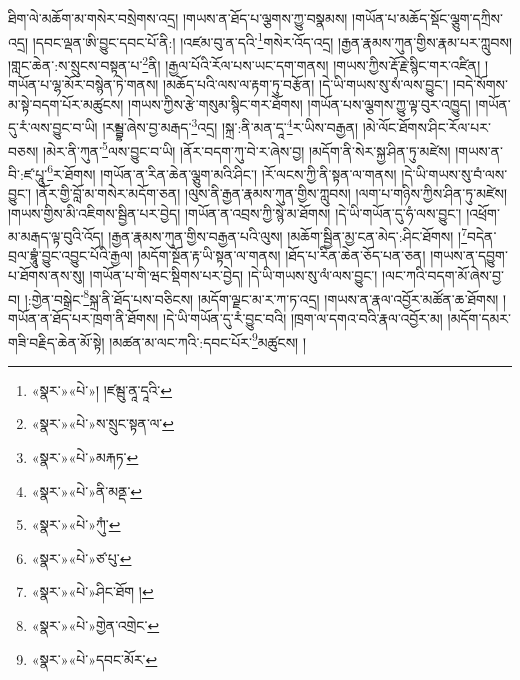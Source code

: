 ཐིག་ལེ་མཆོག་མ་གསེར་བསྲེགས་འདྲ། །གཡས་ན་ཐོད་པ་ལྕགས་ཀྱུ་བསྣམས། །གཡོན་པ་མཆོད་སྡོང་ལྕུག་དཀྲིས་འདྲ། །དབང་ལྡན་ཨི་བྱུང་དབང་པོ་ནི:། །འཛམ་བུ་ན་དའི་\footnote{«སྣར་»«པེ་»། །ཛམྦུ་ནཱ་དཱའི་}གསེར་འོད་འདྲ། །རྒྱན་རྣམས་ཀུན་གྱིས་རྣམ་པར་ཀླུབས། །གླང་ཆེན་:ས་སྲུངས་བསྟན་པ་\footnote{«སྣར་»«པེ་»ས་སྲུང་སྟན་ལ་}ནི། །རྒྱལ་པོའི་རོལ་པས་ཡང་དག་གནས། །གཡས་ཀྱིས་རྡོ་རྗེ་སྙིང་གར་འཛིན། །གཡོན་པ་ལྷ་མོར་བསྙེན་ཏེ་གནས། །མཆོད་པའི་ལས་ལ་རྟག་ཏུ་བརྩོན། །དེ་ཡི་གཡས་སུ་སཾ་ལས་བྱུང་། །བདེ་སོགས་མ་སྟེ་བདག་པོར་མཚུངས། །གཡས་ཀྱིས་རྩེ་གསུམ་སྙིང་གར་ཐོགས། །གཡོན་པས་ལྕགས་ཀྱུ་ལྟ་བུར་འཁྱུད། །གཡོན་དུ་རཾ་ལས་བྱུང་བ་ཡི། །རམྦྷ་ཞེས་བྱ་མརྒད་\footnote{«སྣར་»«པེ་»མརྐཏ་}འདྲ། །སྐྲ་:ནི་མན་དཱ་\footnote{«སྣར་»«པེ་»ནི་མནྡ་}ར་ཡིས་བརྒྱན། །མེ་ལོང་ཐོགས་ཤིང་རོལ་པར་བཅས། །མེར་ནི་ཀུན་\footnote{«སྣར་»«པེ་»ཀུཾ་}ལས་བྱུང་བ་ཡི། །ནོར་བདག་ཀུ་བེ་ར་ཞེས་བྱ། །མདོག་ནི་སེར་སྐྱ་ཤིན་ཏུ་མཛེས། །གཡས་ན་བི་:ཛ་པཱུ་\footnote{«སྣར་»«པེ་»ཙ་པུ་}ར་ཐོགས། །གཡོན་ན་རིན་ཆེན་ལྕུག་མའི་ཤིང་། །རོ་ལངས་ཀྱི་ནི་སྟན་ལ་གནས། །དེ་ཡི་གཡས་སུ་བཾ་ལས་བྱུང་། །ནོར་གྱི་བློ་མ་གསེར་མདོག་ཅན། །ལུས་ནི་རྒྱན་རྣམས་ཀུན་གྱིས་ཀླུབས། །ལག་པ་གཉིས་ཀྱིས་ཤིན་ཏུ་མཛེས། །གཡས་གྱིས་མི་འཇིགས་སྦྱིན་པར་བྱེད། །གཡོན་ན་འབྲས་ཀྱི་སྙེ་མ་ཐོགས། །དེ་ཡི་གཡོན་དུ་ཧཾ་ལས་བྱུང་། །འཕྲོག་མ་མརྒད་ལྟ་བུའི་འོད། །རྒྱན་རྣམས་ཀུན་གྱིས་བརྒྱན་པའི་ལུས། །མཆོག་སྦྱིན་མྱ་ངན་མེད་:ཤིང་ཐོགས། །\footnote{«སྣར་»«པེ་»ཤིང་ཐོག །}བདེན་བྲལ་བྷཱུཾ་བྱུང་འབྱུང་པོའི་རྒྱལ། །མདོག་སྔོན་རྟ་ཡི་སྟན་ལ་གནས། །ཐོད་པ་རིན་ཆེན་ཅོད་པན་ཅན། །གཡས་ན་དབྱུག་པ་ཐོགས་ནས་སུ། །གཡོན་པ་གི་ཝང་སྡིགས་པར་བྱེད། །དེ་ཡི་གཡས་སུ་ལཾ་ལས་བྱུང་། །ལང་ཀའི་བདག་མོ་ཞེས་བྱ་བ། །:གྱེན་བསྒྲེང་\footnote{«སྣར་»«པེ་»གྱེན་འགྲེང་}སྐྲ་ནི་ཐོད་པས་བཅིངས། །མདོག་ལྗང་མ་ར་ཀ་ཏ་འདྲ། །གཡས་ན་རྣལ་འབྱོར་མཚོན་ཆ་ཐོགས། །གཡོན་ན་ཐོད་པར་ཁྲག་ནི་ཐོགས། །དེ་ཡི་གཡོན་དུ་རཾ་བྱུང་བའི། །ཁྲག་ལ་དགའ་བའི་རྣལ་འབྱོར་མ། །མདོག་དམར་གཟི་བརྗིད་ཆེན་མོ་སྟེ། །མཚན་མ་ལང་ཀའི་:དབང་པོར་\footnote{«སྣར་»«པེ་»དབང་མོར་}མཚུངས། །
